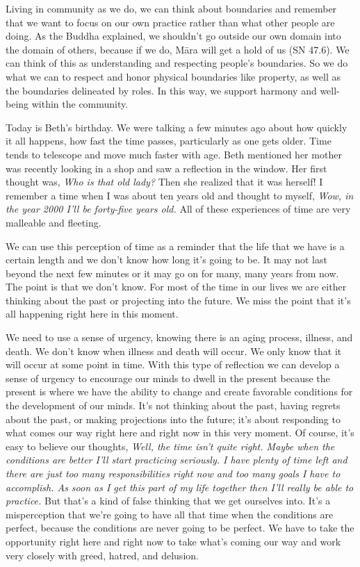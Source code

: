 Living in community as we do, we can think about boundaries and 
remember that we want to focus on our own practice rather than what 
other people are doing. As the Buddha explained, we shouldn't go 
outside our own domain into the domain of others, because if we do, 
Māra will get a hold of us (SN 47.6). We can think of this as 
understanding and respecting people's boundaries. So we do what we can 
to respect and honor physical boundaries like property, as well as the 
boundaries delineated by roles. In this way, we support harmony and 
well-being within the community.


Today is Beth's birthday. We were talking a few minutes ago about how 
quickly it all happens, how fast the time passes, particularly as one 
gets older. Time tends to telescope and move much faster with age. Beth 
mentioned her mother was recently looking in a shop and saw a 
reflection in the window. Her first thought was, \emph{Who is that old 
lady?} Then she realized that it was herself! I remember a time when I 
was about ten years old and thought to myself, \emph{Wow, in the year 
2000 I'll be forty-five years old.} All of these experiences of time 
are very malleable and fleeting.

We can use this perception of time as a reminder that the life that we 
have is a certain length and we don't know how long it's going to be. 
It may not last beyond the next few minutes or it may go on for many, 
many years from now. The point is that we don't know. For most of the 
time in our lives we are either thinking about the past or projecting 
into the future. We miss the point that it's all happening right here 
in this moment.

We need to use a sense of urgency, knowing there is an aging process, 
illness, and death. We don't know when illness and death will occur. We 
only know that it will occur at some point in time. With this type of 
reflection we can develop a sense of urgency to encourage our minds to 
dwell in the present because the present is where we have the ability 
to change and create favorable conditions for the development of our 
minds. It's not thinking about the past, having regrets about the past, 
or making projections into the future; it's about responding to what 
comes our way right here and right now in this very moment. Of course, 
it's easy to believe our thoughts, \emph{Well, the time isn't quite 
right. Maybe when the conditions are better I'll start practicing 
seriously. I have plenty of time left and there are just too many 
responsibilities right now and too many goals I have to accomplish. As 
soon as I get this part of my life together then I'll really be able to 
practice.} But that's a kind of false thinking that we get ourselves 
into. It's a misperception that we're going to have all that time when 
the conditions are perfect, because the conditions are never going to 
be perfect. We have to take the opportunity right here and right now to 
take what's coming our way and work very closely with greed, hatred, 
and delusion.

